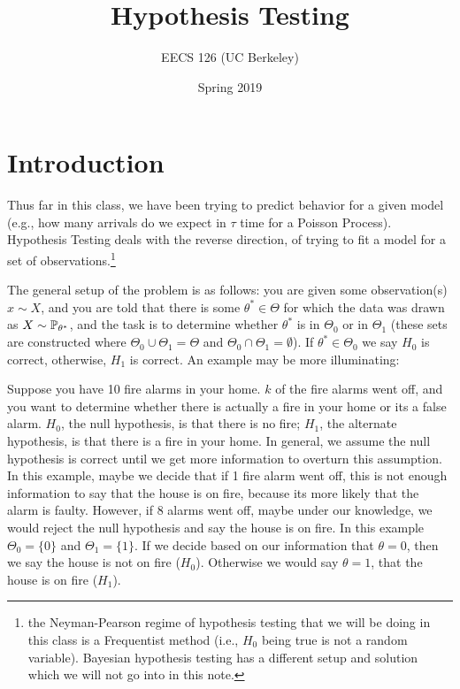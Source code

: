 \documentclass{article}
\title{Hypothesis Testing}
\author{EECS 126 (UC Berkeley)}
\date{Spring 2019}
\begin{document}
\maketitle
\section{Introduction}
Thus far in this class, we have been trying to predict behavior for a given model (e.g., how many arrivals do we expect in $\tau$ time for a Poisson Process). Hypothesis Testing deals with the reverse direction, of trying to fit a model for a set of observations.\footnote{the Neyman-Pearson regime of hypothesis testing that we will be doing in this class is a Frequentist method (i.e., $H_0$ being true is not a random variable). Bayesian hypothesis testing has a different setup and solution which we will not go into in this note.}

The general setup of the problem is as follows: you are given some observation(s) $x \sim X$, and you are told that there is some $\theta^* \in \Theta$ for which the data was drawn as $X \sim \operatorname{\mathbb{P}}_{\theta^*}$, and the task is to determine whether $\theta^*$ is in $\Theta_0$ or in $\Theta_1$ (these sets are constructed where $\Theta_0 \cup \Theta_1 = \Theta$ and $\Theta_0 \cap \Theta_1 = \emptyset$). If $\theta^* \in \Theta_0$ we say $H_0$ is correct, otherwise, $H_1$ is correct. An example may be more illuminating: 


\begin{example}
Suppose you have 10 fire alarms in your home. $k$ of the fire alarms went off, and you want to determine whether there is actually a fire in your home or its a false alarm. $H_0$, the null hypothesis, is that there is no fire; $H_1$, the alternate hypothesis, is that there is a fire in your home. In general, we assume the null hypothesis is correct until we get more information to overturn this assumption. In this example, maybe we decide that if 1 fire alarm went off, this is not enough information to say that the house is on fire, because its more likely that the alarm is faulty. However, if 8 alarms went off, maybe under our knowledge, we would reject the null hypothesis and say the house is on fire. In this example $\Theta_0 = \{ 0 \}$ and $\Theta_1 = \{ 1\}$. If we decide based on our information that $\theta = 0$, then we say the house is not on fire ($H_0$). Otherwise we would say $\theta = 1$, that the house is on fire ($H_1$). 
\end{example}
\end{document}
